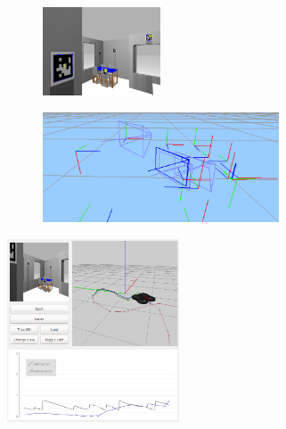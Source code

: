 \documentclass[notes,slidesec,a4]{seminar}
\begin{document}
\begin{hslide}

\begin{center}
	\begin{figure}
		\centering
		\begin{subfigure}
			\centering
			\includegraphics[width=3.5cm]{img/pisoloc3cam}
		\end{subfigure}%
		\begin{subfigure}
			\centering
			\includegraphics[width=7cm]{img/pisoloc3}
		\end{subfigure}
	\end{figure}
\end{center}

\end{hslide}


\begin{hslide}

\begin{center}
	\begin{figure}
		\centering
		\includegraphics[width=5.1cm]{img/fulltest2}
	\end{figure}
\end{center}

\end{hslide}
\end{document}
